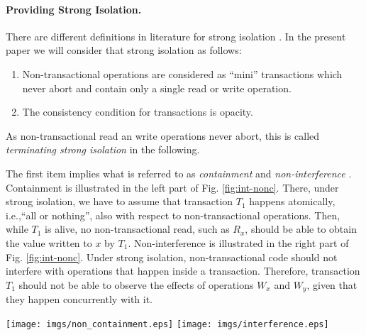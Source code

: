 \documentclass[runningheads,a4paper]{llncs}
\begin{document}
\paragraph{Providing Strong Isolation.}
There  are different  definitions in  literature for  strong 
isolation \cite{blundell06} \cite{ma07} \cite{harris06}.  
In the present  paper we  will consider that strong isolation as  follows:  
\begin{enumerate}
\item   Non-transactional   operations   are   considered   as ``mini''
transactions which never abort and  contain only a single  read or 
write operation. 
\item The consistency condition for transactions is opacity.
\end{enumerate}
As non-transactional read an write operations never abort, 
this is called {\it terminating strong isolation} in the following.





The  first   item   implies   what   is  referred  to  as  
{\it containment}  and
{\it non-interference} \cite{blundell06}.  
Containment is   illustrated in  the  left  part of  Fig.
\ref{fig:int-nonc}.  There,
under strong  isolation, we have  to assume that transaction  $T_1$ happens
atomically,  
i.e.,``all  or  nothing'',   also  with  respect  to  non-transactional
operations. Then, while $T_1$ is  alive, no non-transactional read, such as
$R_x$, should be  
able to obtain  the value written to $x$  by $T_1$. Non-interference
is  illustrated  in  the right part of Fig.  \ref{fig:int-nonc}.  
Under  strong  isolation, non-transactional  
code   should  not  interfere   with  operations   that  happen   inside  a
transaction. Therefore, transaction $T_1$ should not be able to observe the
effects of  
operations $W_x$ and $W_y$, given that they happen concurrently with it. 

\begin{figure*}[ht]
\centerline{
     \mbox{\texttt{[image: imgs/non\_containment.eps]}}
     \mbox{\texttt{[image: imgs/interference.eps]}}
}
\caption{Left:  {\it Containment}  (operation $R_x$  should not  return the
    value written to $x$ inside the transaction). 
Right:  {\it  Non-Interference} (wile  it is still  executing, transaction
$T_1$ should not have access to the values that were written to $x$ and $y$
by process $p_2$).} 
\label{fig:int-nonc}
\end{figure*}
\end{document}
